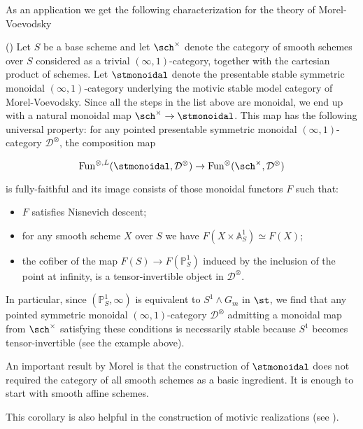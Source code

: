 \begin{refsection}
As an application we get the following characterization for the theory of Morel-Voevodsky

\begin{cor}(\cite[5.11]{nc1})
Let $S$ be a base scheme and let $\sch^{\times}$ denote the category of smooth schemes over $S$ considered as a trivial $(\infty,1)$-category, together with the cartesian product of schemes. Let $\stmonoidal$ denote the presentable stable symmetric monoidal $(\infty,1)$-category underlying the motivic stable model category of Morel-Voevodsky. Since all the steps in the list above are monoidal, we end up with a natural monoidal map $\sch^{\times}\to \stmonoidal$. This map has the following universal property: for any pointed presentable symmetric monoidal $(\infty,1)$-category $\mathcal{D}^{\otimes}$, the composition map


$$\mathrm{Fun}^{\otimes, L}(\stmonoidal , \mathcal{D}^{\otimes})\to \mathrm{Fun}^{\otimes}(\sch^{\times}, \mathcal{D}^{\otimes})$$

\noindent is fully-faithful and its image consists of those monoidal functors $F$ such that:

\begin{itemize}
\item $F$ satisfies Nisnevich descent;
\item for any smooth scheme $X$ over $S$ we have $F(X\times \mathbb{A}^1_S)\simeq F(X)$;
\item the cofiber of the map $F(S)\to F(\mathbb{P}^1_S)$ induced by the inclusion of the point at infinity, is a tensor-invertible object in $\mathcal{D}^{\otimes}$.
\end{itemize}

In particular, since $(\mathbb{P}^1_S, \infty)$ is equivalent to $S^1\wedge G_m$ in $\st$, we find that any pointed symmetric monoidal $(\infty,1)$-category $\mathcal{D}^{\otimes}$ admitting a monoidal map from $\sch^{\times}$ satisfying these conditions is necessarily stable because $S^1$ becomes tensor-invertible (see the example above).
\end{cor}

\begin{remark}
An important result by Morel \cite{MR1693330} is that the construction of $\stmonoidal$ does not required the category of all smooth schemes as a basic ingredient. It is enough to start with smooth affine schemes.\\
\end{remark}


This corollary is also helpful in the construction of motivic realizations (see \cite{brad-thesis}). \\


\end{refsection}
